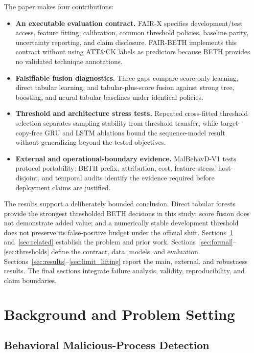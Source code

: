 \documentclass[10pt,journal,compsoc]{IEEEtran}
\begin{document}
The paper makes four contributions:
\begin{itemize}
    \item \textbf{An executable evaluation contract.} FAIR-X specifies development/test access, feature fitting, calibration, common threshold policies, baseline parity, uncertainty reporting, and claim disclosure. FAIR-BETH implements this contract without using ATT\&CK labels as predictors because BETH provides no validated technique annotations.
    \item \textbf{Falsifiable fusion diagnostics.} Three gaps compare score-only learning, direct tabular learning, and tabular-plus-score fusion against strong tree, boosting, and neural tabular baselines under identical policies.
    \item \textbf{Threshold and architecture stress tests.} Repeated cross-fitted threshold selection separates sampling stability from threshold transfer, while target-copy-free GRU and LSTM ablations bound the sequence-model result without generalizing beyond the tested objectives.
    \item \textbf{External and operational-boundary evidence.} MalBehavD-V1 tests protocol portability; BETH prefix, attribution, cost, feature-stress, host-disjoint, and temporal audits identify the evidence required before deployment claims are justified.
\end{itemize}

The results support a deliberately bounded conclusion. Direct tabular forests provide the strongest thresholded BETH decisions in this study; score fusion does not demonstrate added value; and a numerically stable development threshold does not preserve its false-positive budget under the official shift. Sections~\ref{sec:background} and~\ref{sec:related} establish the problem and prior work. Sections~\ref{sec:formal}--\ref{sec:thresholds} define the contract, data, models, and evaluation. Sections~\ref{sec:results}--\ref{sec:limit_lifting} report the main, external, and robustness results. The final sections integrate failure analysis, validity, reproducibility, and claim boundaries.

\section{Background and Problem Setting}
\label{sec:background}

\subsection{Behavioral Malicious-Process Detection}
\end{document}

